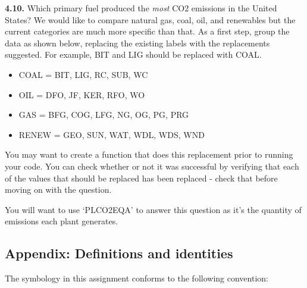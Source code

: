 \documentclass[
  letterpaper,
  DIV=11,
  numbers=noendperiod]{scrartcl}
\providecommand{\tightlist}{%
  \setlength{\itemsep}{0pt}\setlength{\parskip}{0pt}}\usepackage{longtable,booktabs,array}
\begin{document}
\textbf{4.10.} Which primary fuel produced the \emph{most} CO2 emissions
in the United States? We would like to compare natural gas, coal, oil,
and renewables but the current categories are much more specific than
that. As a first step, group the data as shown below, replacing the
existing labels with the replacements suggested. For example, BIT and
LIG should be replaced with COAL.

\begin{itemize}
\tightlist
\item
  COAL = BIT, LIG, RC, SUB, WC
\item
  OIL = DFO, JF, KER, RFO, WO
\item
  GAS = BFG, COG, LFG, NG, OG, PG, PRG
\item
  RENEW = GEO, SUN, WAT, WDL, WDS, WND
\end{itemize}

You may want to create a function that does this replacement prior to
running your code. You can check whether or not it was successful by
verifying that each of the values that should be replaced has been
replaced - check that before moving on with the question.

You will want to use `PLCO2EQA' to answer this question as it's the
quantity of emissions each plant generates.

\newpage{}

\subsection{Appendix: Definitions and
identities}\label{appendix-definitions-and-identities}

The symbology in this assignment conforms to the following convention:
\end{document}
